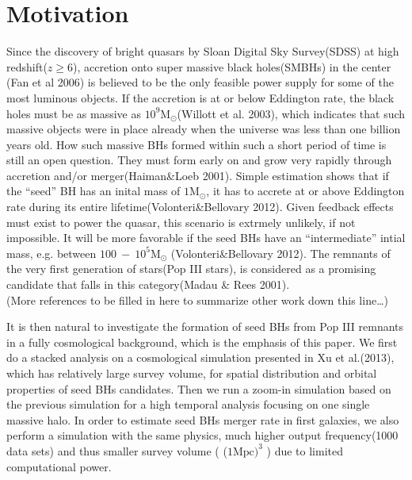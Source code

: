 \documentclass[useAMS,usenatbib]{mn2e}
\begin{document}
\section{Motivation}
Since the discovery of bright quasars by Sloan Digital Sky Survey(SDSS) at high
redshift($z\geq 6$), accretion onto super massive black holes(SMBHs) in the center
(Fan et al 2006) is believed to be the only feasible power supply for some of 
the most luminous objects. If the accretion is at or below Eddington rate, the
black holes must be as massive as $10^9\mbox{M}_{\odot}$(Willott et al. 2003),
which indicates that such massive objects were in place already when the
universe was less than one billion years old. How such massive BHs formed within
such a short period of time is still an open question. They must form early on
and grow very rapidly through accretion and/or merger(Haiman\&Loeb 2001). Simple
estimation shows that if the
``seed'' BH has an inital mass of $1\mbox{M}_{\odot}$, it has to accrete at or
above Eddington rate during its entire lifetime(Volonteri\&Bellovary 2012). 
Given feedback effects must exist to power the quasar, this scenario is extrmely
unlikely, if not impossible. It will be more favorable if the seed BHs have an
``intermediate'' intial mass, e.g. between $100\ -\ 10^5\mbox{M}_\odot$
(Volonteri\&Bellovary 2012). The remnants of the very first generation of
stars(Pop III stars), is considered as a promising candidate that falls in this
category(Madau \& Rees 2001). \\

(More references to be filled in here to summarize other work down this
line\dots)

It is then natural to investigate the formation of seed BHs from Pop III
remnants in a fully cosmological background, which is the emphasis of this
paper. We first do a stacked analysis on a cosmological simulation
presented in Xu et al.(2013), which has relatively large survey volume, for
spatial distribution and orbital properties of seed BHs candidates. Then we run
a zoom-in simulation based on the previous simulation for a high temporal
analysis focusing on one single massive halo. In order to estimate seed BHs
merger rate in first galaxies, we also perform a simulation with the same
physics, much higher output frequency(1000 data sets) and thus smaller survey
volume ( ($1\mbox{Mpc})^3$ ) due to limited computational power. 
\end{document}
